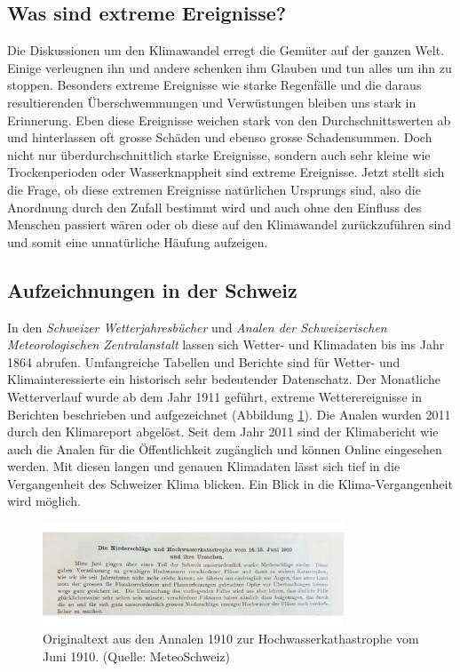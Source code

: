 \begin{refsection}
\section{Was sind extreme Ereignisse?}
Die Diskussionen um den Klimawandel erregt die Gemüter auf der ganzen Welt. Einige verleugnen ihn und andere schenken ihm Glauben und tun alles um ihn zu stoppen. Besonders extreme Ereignisse wie starke Regenfälle und die daraus resultierenden Überschwemmungen und Verwüstungen bleiben uns stark in Erinnerung.
Eben diese Ereignisse weichen stark von den Durchschnittswerten ab und hinterlassen oft grosse Schäden und ebenso grosse Schadensummen. Doch nicht nur überdurchschnittlich starke Ereignisse, sondern auch sehr kleine wie Trockenperioden oder Wasserknappheit sind extreme Ereignisse.
Jetzt stellt sich die Frage, ob diese extremen Ereignisse natürlichen Ursprungs sind, also  die Anordnung durch den Zufall bestimmt wird und auch ohne den Einfluss des Menschen passiert wären oder ob diese auf den Klimawandel zurückzuführen sind und somit eine unnatürliche Häufung aufzeigen.


\subsection{Aufzeichnungen in der Schweiz}
In den \textit{Schweizer Wetterjahresbücher} und \textit{Analen der Schweizerischen Meteorologischen Zentralanstalt} lassen sich Wetter- und Klimadaten bis ins Jahr 1864 abrufen. Umfangreiche Tabellen und Berichte sind für Wetter- und Klimainteressierte ein historisch sehr bedeutender Datenschatz. 
Der Monatliche Wetterverlauf wurde ab dem Jahr 1911 geführt, extreme Wetterereignisse in Berichten beschrieben und aufgezeichnet (Abbildung \ref{Analen}). Die Analen wurden 2011 durch den Klimareport abgelöst. Seit dem Jahr 2011 sind der Klimabericht wie auch die Analen für die Öffentlichkeit zugänglich und können Online eingesehen werden.
Mit diesen langen und genauen Klimadaten lässt sich tief in die Vergangenheit des Schweizer Klima blicken. Ein Blick in die Klima-Vergangenheit wird möglich.

\begin{figure}[htbp]
\centering
\includegraphics[width=0.8\textwidth]{extrem/Analen.jpg}
\caption{Originaltext aus den Annalen 1910 zur Hochwasserkathastrophe vom Juni 1910. (Quelle: MeteoSchweiz)}
\label{Analen}
\end{figure}



\end{refsection}
